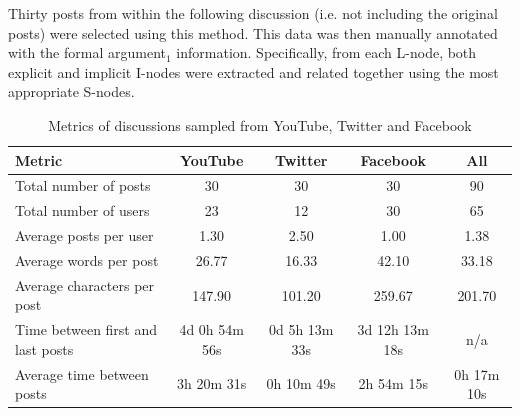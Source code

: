Thirty posts from within the following discussion (i.e. not including the original posts) were selected using this method. This data was then manually annotated with the formal argument$_1$ information. Specifically, from each L-node, both explicit and implicit I-nodes were extracted and related together using the most appropriate S-nodes. %

\begin{table}
\centering
\caption{Metrics of discussions sampled from YouTube, Twitter and Facebook}
\label{table:results:samplestats}
\begin{tabular}{| l | c | c | c | c |}
\hline
\textbf{Metric} & \textbf{YouTube} & \textbf{Twitter} & \textbf{Facebook} & \textbf{All}\\
\hline
Total number of posts & 30 & 30 & 30 & 90\\
\hline
Total number of users & 23 & 12 & 30 & 65\\
\hline
Average posts per user & 1.30 & 2.50 & 1.00 & 1.38\\
\hline
Average words per post & 26.77 & 16.33 & 42.10 & 33.18\\
\hline
Average characters per post & 147.90 & 101.20 & 259.67 & 201.70\\
\hline
Time between first and last posts & 4d 0h 54m 56s & 0d 5h 13m 33s & 3d 12h 13m 18s & n/a\\
\hline
Average time between posts & 3h 20m 31s & 0h 10m 49s & 2h 54m 15s & 0h 17m 10s\\
\hline
\end{tabular}
\end{table}


